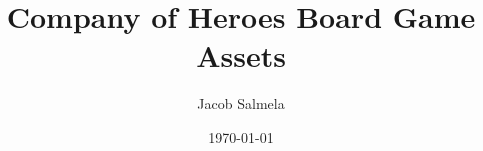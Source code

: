 \title{Company of Heroes Board Game Assets}
\author{Jacob Salmela}
\date{\today}
\usepackage{extsizes}
\usepackage[a4paper, total={8.5in, 11in},margin=5mm,top=10mm,left=10mm,right=5mm]{geometry}
\usepackage{fontspec}
\usepackage{multicol}
\usepackage{multirow} %
\usepackage{tabularx}
\usepackage{hhline}
\usepackage{graphicx} %
\usepackage[table]{xcolor}
\usepackage{float}
